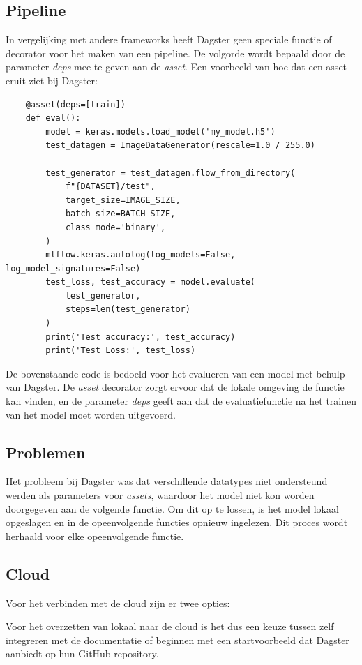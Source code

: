 \subsection{Pipeline}
In vergelijking met andere frameworks heeft Dagster geen speciale functie of decorator voor het maken van een pipeline. De volgorde wordt bepaald door de parameter \textit{deps} mee te geven aan de \textit{asset}.
Een voorbeeld van hoe dat een asset eruit ziet bij Dagster:
\begin{verbatim}
    @asset(deps=[train])
    def eval():
        model = keras.models.load_model('my_model.h5')
        test_datagen = ImageDataGenerator(rescale=1.0 / 255.0)

        test_generator = test_datagen.flow_from_directory(
            f"{DATASET}/test",
            target_size=IMAGE_SIZE,
            batch_size=BATCH_SIZE,
            class_mode='binary',
        )
        mlflow.keras.autolog(log_models=False, log_model_signatures=False)
        test_loss, test_accuracy = model.evaluate(
            test_generator,
            steps=len(test_generator)
        )
        print('Test accuracy:', test_accuracy)
        print('Test Loss:', test_loss)
\end{verbatim}
De bovenstaande code is bedoeld voor het evalueren van een model met behulp van Dagster. De \textit{asset} decorator zorgt ervoor dat de lokale omgeving de functie kan vinden, en de parameter \textit{deps} geeft aan dat de evaluatiefunctie na het trainen van het model moet worden uitgevoerd.
\subsection{Problemen}
Het probleem bij Dagster was dat verschillende datatypes niet ondersteund werden als parameters voor \textit{assets}, waardoor het model niet kon worden doorgegeven aan de volgende functie. Om dit op te lossen, is het model lokaal opgeslagen en in de opeenvolgende functies opnieuw ingelezen. Dit proces wordt herhaald voor elke opeenvolgende functie.
\subsection{Cloud}
Voor het verbinden met de cloud zijn er twee opties:

Voor het overzetten van lokaal naar de cloud is het dus een keuze tussen zelf integreren met de documentatie of beginnen met een startvoorbeeld dat Dagster aanbiedt op hun GitHub-repository.